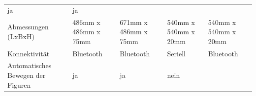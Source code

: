 \begin{longtable}[]{@{}lllll@{}}
\begin{minipage}[t]{0.15\columnwidth}
ja\strut
\end{minipage} & \begin{minipage}[t]{0.13\columnwidth}\raggedright
ja\strut
\end{minipage}\tabularnewline
\begin{minipage}[t]{0.18\columnwidth}\raggedright
Abmessungen (LxBxH)\strut
\end{minipage} & \begin{minipage}[t]{0.18\columnwidth}\raggedright
486mm x 486mm x 75mm\strut
\end{minipage} & \begin{minipage}[t]{0.22\columnwidth}\raggedright
671mm x 486mm x 75mm\strut
\end{minipage} & \begin{minipage}[t]{0.15\columnwidth}\raggedright
540mm x 540mm x 20mm\strut
\end{minipage} & \begin{minipage}[t]{0.13\columnwidth}\raggedright
540mm x 540mm x 20mm\strut
\end{minipage}\tabularnewline
\begin{minipage}[t]{0.18\columnwidth}\raggedright
Konnektivität\strut
\end{minipage} & \begin{minipage}[t]{0.18\columnwidth}\raggedright
Bluetooth\strut
\end{minipage} & \begin{minipage}[t]{0.22\columnwidth}\raggedright
Bluetooth\strut
\end{minipage} & \begin{minipage}[t]{0.15\columnwidth}\raggedright
Seriell\strut
\end{minipage} & \begin{minipage}[t]{0.13\columnwidth}\raggedright
Bluetooth\strut
\end{minipage}\tabularnewline
\begin{minipage}[t]{0.18\columnwidth}\raggedright
Automatisches Bewegen der Figuren\strut
\end{minipage} & \begin{minipage}[t]{0.18\columnwidth}\raggedright
ja\strut
\end{minipage} & \begin{minipage}[t]{0.22\columnwidth}\raggedright
ja\strut
\end{minipage} & \begin{minipage}[t]{0.15\columnwidth}\raggedright
nein\strut
\end{minipage} & \begin{minipage}[t]{0.13\columnwidth}\raggedright

\end{minipage}
\end{longtable}
